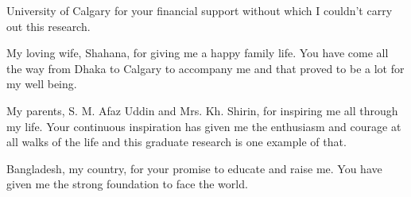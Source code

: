 \documentclass{ucalgthes1}
\begin{document}
University of Calgary for your financial support without which I couldn't carry out this research.

My loving wife, Shahana, for giving me a happy family life. You have come all the way from Dhaka to Calgary to accompany me and that proved to be a lot for my well being.

My parents, S. M. Afaz Uddin and Mrs. Kh. Shirin, for inspiring me all through my life. Your continuous inspiration has given me the enthusiasm and courage at all walks of the life and this graduate research is one example of that.

Bangladesh, my country, for your promise to educate and raise me. You have given me the strong foundation to face the world.

\begin{singlespace}
\newpage
{}
\tableofcontents
\pagestyle{plain}
\newpage
{}
\listoftables
\pagestyle{plain}
\newpage
{}
\listoffigures
\pagestyle{plain}
\clearpage
\end{singlespace}
\clearpage          %








% 
\end{document}
